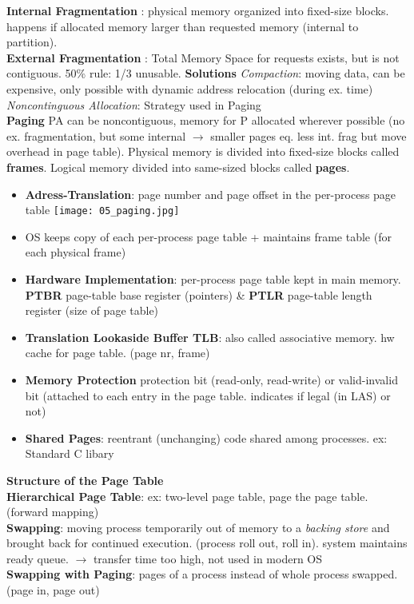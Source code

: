     \textbf{Internal Fragmentation }: physical memory organized into fixed-size blocks. happens if allocated memory larger than requested memory (internal to partition). \\
    \textbf{External Fragmentation }: Total Memory Space for requests exists, but is not contiguous. 50\% rule: 1/3 unusable. \textbf{Solutions} \textit{Compaction}: moving data, can be expensive, only possible with dynamic address relocation (during ex. time) \textit{Noncontinguous Allocation}: Strategy used in Paging \\
    \textbf{Paging } PA can be noncontiguous, memory for P allocated wherever possible (no ex. fragmentation, but some internal $\rightarrow$ smaller pages eq. less int. frag but move overhead in page table). Physical memory is divided into fixed-size blocks called \textbf{frames}. Logical memory divided into same-sized blocks called \textbf{pages}.\\
        \begin{itemize}
            \item \textbf{Adress-Translation}: page number and page offset in the per-process page table
                \texttt{[image: 05\_paging.jpg]} %
            \item OS keeps copy of each per-process page table + maintains frame table (for each physical frame)
            \item \textbf{Hardware Implementation}: per-process page table kept in main memory. \textbf{PTBR} page-table base register (pointers) \& \textbf{PTLR} page-table length register (size of page table)
            \item \textbf{Translation Lookaside Buffer TLB}: also called associative memory. hw cache for page table. (page nr, frame)
            \item \textbf{Memory Protection} protection bit (read-only, read-write) or valid-invalid bit (attached to each entry in the page table. indicates if legal (in LAS) or not)
            \item \textbf{Shared Pages}: reentrant (unchanging) code shared among processes. ex: Standard C libary
        \end{itemize}
        \textbf{Structure of the Page Table} \\
        \textbf{Hierarchical Page Table}: ex: two-level page table, page the page table. (forward mapping) \\
        \textbf{Swapping}: moving process temporarily out of memory to a \textit{backing store} and brought back for continued execution. (process roll out, roll in). system maintains ready queue. $\rightarrow$ transfer time too high, not used in modern OS  \\
        \textbf{Swapping with Paging}: pages of a process instead of whole process swapped. (page in, page out)
